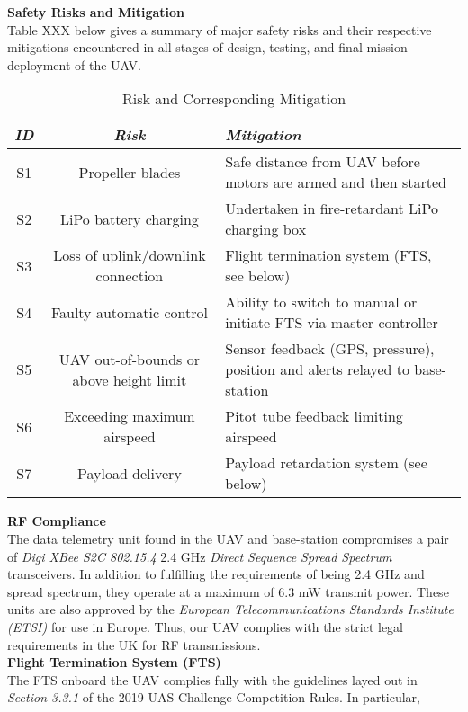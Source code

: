 \noindent \textbf{Safety Risks and Mitigation} \\
Table XXX below gives a summary of major safety risks and their respective mitigations encountered in all stages of design, testing, and final mission deployment of the UAV.

\begin{table}[h]
 \centering
 \begin{tabular}{||c | c | p{55mm}||} 
 \hline
 \textit{ID} & \textit{Risk} & \textit{Mitigation} \\ [0.5ex] 
 \hline\hline
 S1 & Propeller blades & Safe distance from UAV before motors are armed and then started \\
 \hline
 S2 & LiPo battery charging & Undertaken in fire-retardant LiPo charging box \\
 \hline
 S3 & Loss of uplink/downlink connection & Flight termination system (FTS, see below) \\
 \hline
 S4 & Faulty automatic control & Ability to switch to manual or initiate FTS via master controller \\
 \hline
 S5 & UAV out-of-bounds or above height limit & Sensor feedback (GPS, pressure), position and alerts relayed to base-station \\
 \hline
 S6 & Exceeding maximum airspeed & Pitot tube feedback limiting airspeed \\
 \hline
 S7 & Payload delivery & Payload retardation system (see below) \\
 \hline
\end{tabular}
\caption{Risk and Corresponding Mitigation}
\end{table}

\noindent \textbf{RF Compliance} \\
The data telemetry unit found in the UAV and base-station compromises a pair of \textit{Digi XBee S2C 802.15.4} 2.4 GHz \textit{Direct Sequence Spread Spectrum} transceivers. In addition to fulfilling the requirements of being 2.4 GHz and spread spectrum, they operate at a maximum of 6.3 mW transmit power. These units are also approved by the \textit{European Telecommunications Standards Institute (ETSI)} for use in Europe. Thus, our UAV complies with the strict legal requirements in the UK for RF transmissions. \\

\noindent \textbf{Flight Termination System (FTS)} \\
The FTS onboard the UAV complies fully with the guidelines layed out in \textit{Section 3.3.1} of the 2019 UAS Challenge Competition Rules. In particular,

